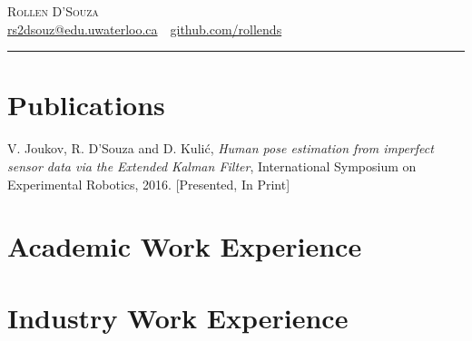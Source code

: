 \documentclass[oneside, 10pt]{memoir}
\begin{document}
\LARGE{\textsc{Rollen D'Souza}}\\
\small{\url{rs2dsouz@edu.uwaterloo.ca}~\textbullet~\url{github.com/rollends} }\\
\rule{\textwidth}{0.4pt}

\section*{Publications}
\begin{adjustwidth}{1em}{0em}
V. Joukov, R. D'Souza and D. Kuli\'{c}, \emph{Human pose estimation from imperfect sensor data via the Extended Kalman Filter}, International Symposium on Experimental Robotics, 2016. [Presented, In Print]
\end{adjustwidth}

\section*{Academic Work Experience}
\begin{adjustwidth}{1em}{0em}

\end{adjustwidth}

\section*{Industry Work Experience}
\end{document}

